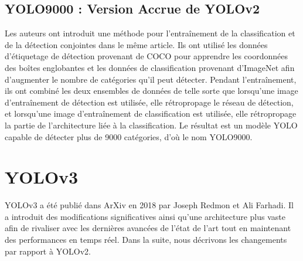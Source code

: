 \documentclass{article}
\begin{document}
\subsection{YOLO9000 : Version Accrue de YOLOv2}

Les auteurs ont introduit une méthode pour l'entraînement de la classification et de la détection conjointes dans le même article. Ils ont utilisé les données d'étiquetage de détection provenant de COCO \cite{37} pour apprendre les coordonnées des boîtes englobantes et les données de classification provenant d'ImageNet afin d'augmenter le nombre de catégories qu'il peut détecter. Pendant l'entraînement, ils ont combiné les deux ensembles de données de telle sorte que lorsqu'une image d'entraînement de détection est utilisée, elle rétropropage le réseau de détection, et lorsqu'une image d'entraînement de classification est utilisée, elle rétropropage la partie de l'architecture liée à la classification. Le résultat est un modèle YOLO capable de détecter plus de 9000 catégories, d'où le nom YOLO9000.

\section{YOLOv3}
YOLOv3 \cite{46} a été publié dans ArXiv en 2018 par Joseph Redmon et Ali Farhadi. Il a introduit des modifications significatives ainsi qu'une architecture plus vaste afin de rivaliser avec les dernières avancées de l'état de l'art tout en maintenant des performances en temps réel. Dans la suite, nous décrivons les changements par rapport à YOLOv2.
\end{document}
